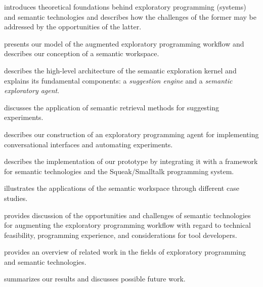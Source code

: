 \begin{description}[noextralabelsep]
	\item[\cref{cha:background}] introduces theoretical foundations behind exploratory programming (systems) and semantic technologies and describes how the challenges of the former may be addressed by the opportunities of the latter.
	\item[\cref{cha:approach}] presents our model of the augmented exploratory programming workflow and describes our conception of a semantic workspace.
	\item[\cref{cha:design}] describes the high-level architecture of the semantic exploration kernel and explains its fundamental components: a \emph{suggestion engine} and a \emph{semantic exploratory agent}.
	\item[\cref{cha:suggestions}] discusses the application of semantic retrieval methods for suggesting experiments.
	\item[\cref{cha:agent}] describes our construction of an exploratory programming agent for implementing conversational interfaces and automating experiments.
	\item[\cref{cha:implementation}] describes the implementation of our prototype by integrating it with a framework for semantic technologies and the Squeak/Smalltalk programming system.
	\item[\cref{cha:application}] illustrates the applications of the semantic workspace through different case studies.
	\item[\cref{cha:discussion}] provides discussion of the opportunities and challenges of semantic technologies for augmenting the exploratory programming workflow with regard to technical feasibility, programming experience, and considerations for tool developers.
	\item[\cref{cha:related_work}] provides an overview of related work in the fields of exploratory programming and semantic technologies.
	\item[\cref{cha:conclusion}] summarizes our results and discusses possible future work.
\end{description}

